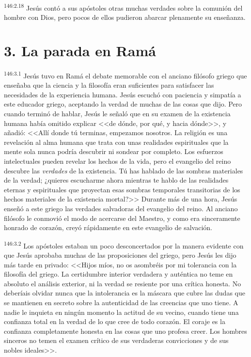 \par 
\textsuperscript{146:2.18} Jesús contó a sus apóstoles otras muchas verdades sobre la comunión del hombre con Dios, pero pocos de ellos pudieron abarcar plenamente su enseñanza.

\section*{3. La parada en Ramá}
\par 
\textsuperscript{146:3.1} Jesús tuvo en Ramá el debate memorable con el anciano filósofo griego que enseñaba que la ciencia y la filosofía eran suficientes para satisfacer las necesidades de la experiencia humana. Jesús escuchó con paciencia y simpatía a este educador griego, aceptando la verdad de muchas de las cosas que dijo. Pero cuando terminó de hablar, Jesús le señaló que en su examen de la existencia humana había omitido explicar <<de dónde, por qué, y hacia dónde>>, y añadió: <<Allí donde tú terminas, empezamos nosotros. La religión es una revelación al alma humana que trata con unas realidades espirituales que la mente sola nunca podría descubrir ni sondear por completo. Los esfuerzos intelectuales pueden revelar los hechos de la vida, pero el evangelio del reino descubre las \textit{verdades} de la existencia. Tú has hablado de las sombras materiales de la verdad; ¿quieres escucharme ahora mientras te hablo de las realidades eternas y espirituales que proyectan esas sombras temporales transitorias de los hechos materiales de la existencia mortal?>> Durante más de una hora, Jesús enseñó a este griego las verdades salvadoras del evangelio del reino. Al anciano filósofo le conmovió el modo de acercarse del Maestro, y como era sinceramente honrado de corazón, creyó rápidamente en este evangelio de salvación.

\par 
\textsuperscript{146:3.2} Los apóstoles estaban un poco desconcertados por la manera evidente con que Jesús aprobaba muchas de las proposiciones del griego, pero Jesús les dijo más tarde en privado: <<Hijos míos, no os asombréis por mi tolerancia con la filosofía del griego. La certidumbre interior verdadera y auténtica no teme en absoluto el análisis exterior, ni la verdad se resiente por una crítica honesta. No deberíais olvidar nunca que la intolerancia es la máscara que cubre las dudas que se mantienen en secreto sobre la autenticidad de las creencias que uno tiene. A nadie le inquieta en ningún momento la actitud de su vecino, cuando tiene una confianza total en la verdad de lo que cree de todo corazón. El coraje es la confianza completamente honesta en las cosas que uno profesa creer. Los hombres sinceros no temen el examen crítico de sus verdaderas convicciones y de sus nobles ideales>>.

